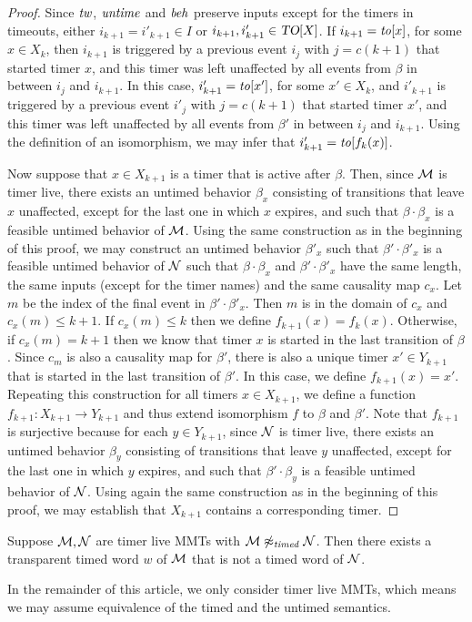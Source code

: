 \begin{proof}
Since $\mathit{tw}$, $\mathit{untime}$ and $\mathit{beh}$ preserve inputs except for the timers in timeouts,
either $i_{k+1} = i'_{k+1} \in I$ or $i_{k+1}, i'_{k+1} \in\mbox{\sl TO}[X]$.
If $i_{k+1} = \mathit{to}[x]$, for some $x \in X_k$, then $i_{k+1}$ is triggered by a previous event $i_j$ with $j=c(k+1)$ that started
timer $x$, and this timer was left unaffected by all events from $\beta$ in between $i_j$ and $i_{k+1}$. In this case,
$i'_{k+1} = \mathit{to}[x']$, for some $x' \in X_k$, and $i'_{k+1}$ is triggered by a previous event $i'_j$ with $j=c(k+1)$ that started
timer $x'$, and this timer was left unaffected by all events from $\beta'$ in between $i_j$ and $i_{k+1}$.
Using the definition of an isomorphism, we may infer that $i'_{k+1} = \mathit{to}[f_k(x)]$.

Now suppose that $x \in X_{k+1}$ is a timer that is active after $\beta$.
Then, since ${\mathcal M}$ is timer live, there exists an untimed behavior $\beta_x$ consisting of transitions that leave $x$ unaffected, except for the last one in which $x$ expires, and such that $\beta \cdot \beta_x$ is a feasible untimed behavior of ${\mathcal M}$.
Using the same construction as in the beginning of this proof, we may construct an untimed behavior $\beta'_x$ such
that $\beta' \cdot \beta'_x$ is a feasible untimed behavior of ${\mathcal N}$ such that $\beta \cdot \beta_x$ and $\beta' \cdot \beta'_x$
have the same length, the same inputs (except for the timer names) and the same causality map $c_x$.
Let $m$ be the index of the final event in $\beta' \cdot \beta'_x$. Then $m$ is in the domain of $c_x$ and $c_x(m) \leq k+1$.
If $c_x(m) \leq k$ then we define $f_{k+1}(x) = f_k (x)$.
Otherwise, if $c_x(m) = k+1$ then we know that timer $x$ is started in the last transition of $\beta$.
Since $c_m$ is also a causality map for $\beta'$, there is also a unique timer $x' \in Y_{k+1}$ that is started in the last transition of $\beta'$.
In this case, we define $f_{k+1}(x) = x'$.
Repeating this construction for all timers $x \in X_{k+1}$, we define a function $f_{k+1} : X_{k+1} \rightarrow Y_{k+1}$ and thus
extend isomorphism $f$ to $\beta$ and $\beta'$.
Note that $f_{k+1}$ is surjective because for each $y \in Y_{k+1}$, since ${\mathcal N}$ is timer live,
there exists an untimed behavior $\beta_y$ consisting of transitions that leave $y$ unaffected, except for the last one in which $y$ expires, and such that $\beta' \cdot \beta_y$ is a feasible untimed behavior of ${\mathcal N}$.
Using again the same construction as in the beginning of this proof, we may establish that $X_{k+1}$ contains a corresponding timer. 
\end{proof}
\fi

\begin{lemma}
\label{not timed}
Suppose ${\mathcal M}, {\mathcal N}$ are timer live MMTs with ${\mathcal M} \not\approx_{\mathit{timed}} {\mathcal N}$.
Then there exists a transparent timed word $w$ of ${\mathcal M}$ that is not a timed word of ${\mathcal N}$.
\end{lemma}

In the remainder of this article, we only consider timer live MMTs,
which means we may assume equivalence of the timed and the untimed semantics.
